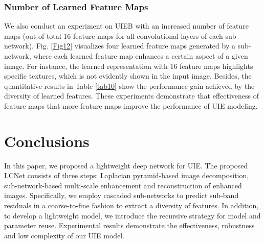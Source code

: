 \documentclass[journal]{IEEEtran}
\begin{document}
\subsubsection{Number of Learned Feature Maps}
We also conduct an experiment on UIEB with an increased number of feature maps (out of total 16 feature maps for all convolutional layers of each sub-network). Fig. \ref{Fig12} visualizes four learned feature maps generated by a sub-network, where each learned feature map enhances a certain aspect of a given image. For instance, the learned representation with 16 feature maps highlights specific textures, which is not evidently shown in the input image. Besides, the quantitative results in Table \ref{tab10} show the performance gain achieved by the diversity of learned features. These experiments demonstrate that effectiveness of feature maps that more feature maps improve the performance of UIE modeling. 






\section{Conclusions}
In this paper, we proposed a lightweight deep network for UIE. The proposed LCNet consists of three steps: Laplacian pyramid-based image decomposition, sub-network-based multi-scale enhancement and reconstruction of enhanced images. Specifically, we employ cascaded sub-networks to predict sub-band residuals in a coarse-to-fine fashion to extract a diversity of features. In addition, to develop a lightweight model, we introduce the recursive strategy for model and parameter reuse. Experimental results demonstrate the effectiveness, robustness and low complexity of our UIE model.

\end{document}
